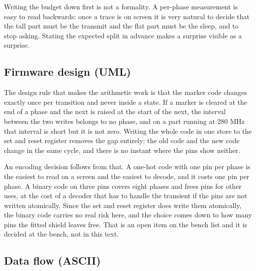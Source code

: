 Writing the budget down first is not a formality. A per-phase measurement is
easy to read backwards: once a trace is on screen it is very natural to decide
that the tall part must be the transmit and the flat part must be the sleep,
and to stop asking. Stating the expected split in advance makes a surprise
visible as a surprise.

\subsection*{Firmware design (UML)}


The design rule that makes the arithmetic work is that the marker code changes
exactly once per transition and never inside a state. If a marker is cleared at
the end of a phase and the next is raised at the start of the next, the interval
between the two writes belongs to no phase, and on a part running at 280 MHz
that interval is short but it is not zero. Writing the whole code in one store
to the set and reset register removes the gap entirely: the old code and the new
code change in the same cycle, and there is no instant where the pins show
neither.

An encoding decision follows from that. A one-hot code with one pin per phase is
the easiest to read on a screen and the easiest to decode, and it costs one pin
per phase. A binary code on three pins covers eight phases and frees pins for
other uses, at the cost of a decoder that has to handle the transient if the
pins are not written atomically. Since the set and reset register does write them
atomically, the binary code carries no real risk here, and the choice comes down
to how many pins the fitted shield leaves free. That is an open item on the
bench list and it is decided at the bench, not in this text.

\subsection*{Data flow (ASCII)}

